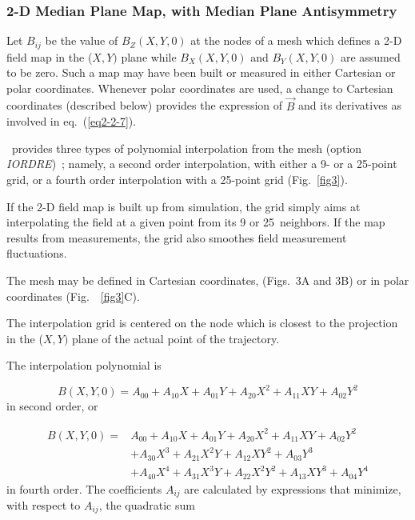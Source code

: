   
\subsubsection{2-D Median Plane Map, with Median Plane Antisymmetry} \label{sec2.4.2}

Let $ B_{ij} $ be the value of $ B_Z(X,Y,0) $ at the nodes of a mesh
which defines a 2-D field map in the ($ X,Y) $ plane while $ B_X(X,Y,0) $ and $ B_Y(X,Y,0) $
are assumed to be zero.  Such a map may have been built or measured 
in either Cartesian or polar coordinates.  Whenever polar coordinates are used, a
change to Cartesian coordinates (described below) provides the expression of 
$ \vec  B $ and its derivatives as involved in eq.~(\ref{eq2-2-7}). 

\noindent\zgou\ provides three types of polynomial
interpolation from the mesh (option \textsl{IORDRE})~; namely, a second order interpolation, 
with either a 9- or a 25-point grid, or a fourth 
order interpolation with a 25-point  grid (Fig.~\ref{fig3}).  

\noindent If the 2-D field map is built up from  simulation, the grid simply
aims at interpolating the field at a given point from its 9 or 25~neighbors.  If 
the map results from measurements, the grid also smoothes field measurement 
fluctuations. 

\noindent The mesh may be defined in Cartesian coordinates, 
(Figs.~3A and 3B) or in polar coordinates (Fig.~~\ref{fig3}C).   

\noindent The interpolation grid is centered on the node which is closest to
the projection in  the ($ X,Y) $ plane of the actual point of the trajectory. 

\noindent The interpolation polynomial is 

 \begin{equation}
	 B(X,Y,0) = A_{00} + A_{10}X + A_{01}Y + A_{20}X^2 + A_{11}XY + A_{02}Y^2
 	\label{eq2-4-4}
 \end{equation}
 in second order, or 

 \begin{equation}
	 \begin{aligned}
		 B(X,Y,0)  = 
		    & A_{00}+A_{10}X+A_{01}Y + A_{20}X^2 + A_{11}XY + A_{02}Y^2 \\
		    & +  A_{30}X^3+A_{21}X^2Y + A_{12}XY^2 + A_{03}Y^3 \\
		    & +  A_{40}X^4 + A_{31}X^3Y + A_{22}X^2Y^2 +A_{13}XY^3 + A_{04}Y^4 
	 \end{aligned}
 	\label{eq2-4-5}
 \end{equation}
%
in fourth order.  The coefficients $ A_{ij} $ are calculated by
expressions that 
minimize, with respect to $ A_{ij}$, the quadratic sum 

